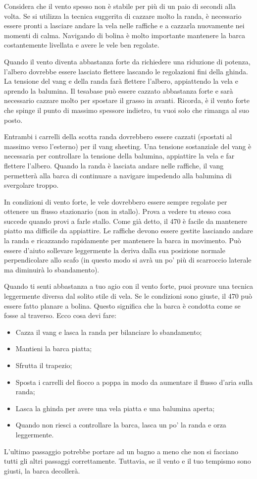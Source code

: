 Considera che il vento spesso non è stabile per più
di un paio di secondi alla volta. Se si utilizza la tecnica suggerita di cazzare molto
la randa, è necessario essere pronti a lasciare andare la vela nelle
raffiche e a cazzarla nuovamente nei momenti di calma. Navigando di bolina è
molto importante mantenere la barca costantemente livellata e avere le vele ben
regolate.

Quando il vento diventa abbastanza forte da richiedere una riduzione
di potenza, l'albero dovrebbe essere lasciato flettere lascando le regolazioni
fini della ghinda. La tensione del
vang e della randa farà flettere l'albero, appiattendo la vela e
aprendo la balumina. Il tesabase può essere cazzato abbastanza forte e sarà
necessario cazzare molto \cunningham per spostare il grasso in avanti. Ricorda, è
il vento forte che spinge il punto di massimo spessore indietro, tu vuoi solo
che rimanga al suo posto.

Entrambi i carrelli della scotta randa dovrebbero essere cazzati (spostati al massimo
verso l'esterno) per il vang sheeting. Una tensione sostanziale del vang è
necessaria per controllare la tensione della balumina, appiattire la vela e far
flettere l'albero. Quando la randa è lasciata andare nelle raffiche, il vang
permetterà alla barca di continuare a navigare impedendo alla balumina di
svergolare troppo.

In condizioni di vento forte, le vele dovrebbero essere sempre regolate per
ottenere un flusso stazionario (non in stallo). Prova a vedere tu stesso cosa succede quando provi
a farle stallo. Come già detto, il
470 è facile da mantenere piatto ma difficile da appiattire. Le raffiche devono
essere gestite lasciando andare la randa e ricazzando rapidamente per mantenere
la barca in movimento. Può essere d'aiuto sollevare leggermente la deriva dalla
sua posizione normale perpendicolare allo scafo (in questo modo si avrà un po'
più di scarroccio laterale ma diminuirà lo sbandamento).

Quando ti senti abbastanza a tuo agio con il vento forte, puoi provare una
tecnica leggermente diversa dal solito stile di vela. Se le condizioni sono
giuste, il 470 può essere fatto planare a bolina. Questo significa che la barca
è condotta come se fosse al traverso. Ecco cosa devi fare:
\begin{itemize}
      \item Cazza il vang e lasca la randa per bilanciare lo sbandamento;
      \item Mantieni la barca piatta;
      \item Sfrutta il trapezio;
      \item Sposta i carrelli del fiocco a poppa in modo da aumentare il flusso
            d'aria sulla randa;
      \item Lasca la ghinda per avere una vela piatta e una balumina aperta;
      \item Quando non riesci a controllare la barca, lasca un po' la randa e orza
            leggermente.
\end{itemize}
L'ultimo passaggio potrebbe portare ad un bagno a meno che non si facciano tutti
gli altri passaggi correttamente. Tuttavia, se il vento e il tuo tempismo sono
giusti, la barca decollerà.

